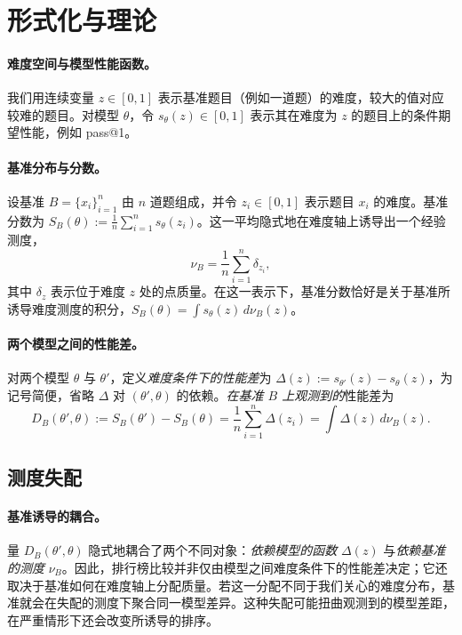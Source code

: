 \section{形式化与理论}

\paragraph{难度空间与模型性能函数。}
我们用连续变量 $z\in[0,1]$ 表示基准题目（例如一道题）的难度，较大的值对应较难的题目。对模型 $\theta$，令 $s_\theta(z)\in[0,1]$ 表示其在难度为 $z$ 的题目上的条件期望性能，例如 pass@1。
  \vspace{-2mm}
\paragraph{基准分布与分数。}
设基准 $B=\{x_i\}_{i=1}^n$ 由 $n$ 道题组成，并令
$z_i\in[0,1]$ 表示题目 $x_i$ 的难度。基准分数为 $S_B(\theta):=\frac{1}{n}\sum_{i=1}^n s_\theta(z_i)$。这一平均隐式地在难度轴上诱导出一个经验测度，
\[
\nu_B=\frac{1}{n}\sum_{i=1}^n \delta_{z_i},
\]
其中 $\delta_z$ 表示位于难度 $z$ 处的点质量。在这一表示下，基准分数恰好是关于基准所诱导难度测度的积分，$S_B(\theta)=\int s_\theta(z)\,d\nu_B(z)$。

\paragraph{两个模型之间的性能差。}
对两个模型 $\theta$ 与 $\theta'$，定义\emph{难度条件下的性能差}为 $\Delta(z):=s_{\theta'}(z)-s_\theta(z)$，为记号简便，省略 $\Delta$ 对 $(\theta',\theta)$ 的依赖。\textit{在基准 $B$ 上观测到的}性能差为
\[
D_B(\theta',\theta)
:= S_B(\theta')-S_B(\theta)
= \frac{1}{n}\sum_{i=1}^n \Delta(z_i)
= \int \Delta(z)\,d\nu_B(z).
\]

\subsection{测度失配}
\paragraph{基准诱导的耦合。}
量 $D_B(\theta',\theta)$ 隐式地耦合了两个不同对象：\textit{依赖模型的函数} $\Delta(z)$ 与\textit{依赖基准的测度} $\nu_B$。因此，排行榜比较并非仅由模型之间难度条件下的性能差决定；它还取决于基准如何在难度轴上分配质量。若这一分配不同于我们关心的难度分布，基准就会在失配的测度下聚合同一模型差异。这种失配可能扭曲观测到的模型差距，在严重情形下还会改变所诱导的排序。

